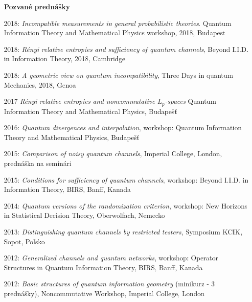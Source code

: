 \documentclass[12pt]{article}
\begin{document}
\noindent
\textbf{Pozvané prednášky}

\begin{description}[noitemsep,leftmargin=1.3cm, font=\normalfont]
\item{2018:}  \emph{Incompatible measurements in general probabilistic theories}. Quantum Information Theory and Mathematical Physics workshop, 2018, Budapest

\item{2018:} \emph{Rényi relative entropies and sufficiency of quantum channels}, Beyond I.I.D. in Information Theory, 2018, Cambridge

\item{2018:} \emph{A geometric view on quantum incompatibility}, Three Days in quantum Mechanics, 2018, Genoa


\item{2017} \emph{Rényi relative entropies and noncommutative $L_p$-spaces} Quantum Information Theory and Mathematical Physics,  Budapešť
\item{2016:} \emph{Quantum divergences and interpolation},  workshop: Quantum Information Theory and Mathematical Physics,  Budapešť  
\item{2015:} \emph{Comparison of noisy quantum channels}, Imperial College, London, prednáška na seminári
\item{2015:} \emph{Conditions for sufficiency of quantum channels}, workshop: Beyond I.I.D. in Information Theory, BIRS, Banff, Kanada
\item{2014:} \emph{Quantum versions of the randomization criterion}, workshop: New Horizons in Statistical Decision Theory,  Oberwolfach, Nemecko
\item{2013:} \emph{Distinguishing quantum channels by restricted testers},  Symposium KCIK, Sopot, Poľsko

\item{2012:} \emph{Generalized channels and quantum networks}, workshop: Operator Structures in Quantum Information Theory,  BIRS, Banff, Kanada
\item{2012:} \emph{Basic structures of quantum information geometry} (minikurz - 3 prednášky),  Noncommutative Workshop,  Imperial College, London


\end{description}
\end{document}
